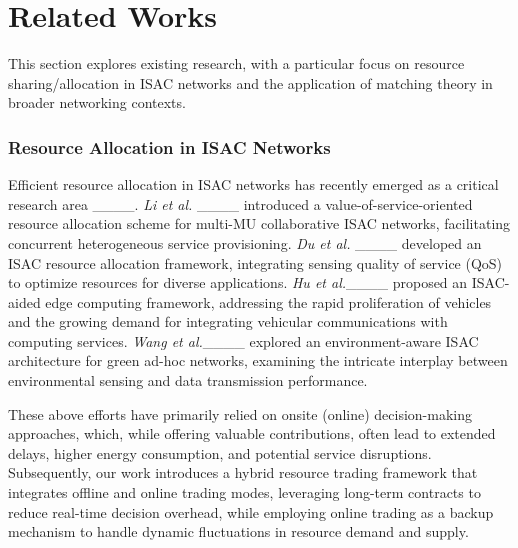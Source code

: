 \section{Related Works}
This section explores existing research, with a particular focus on resource sharing/allocation in ISAC networks and the application of matching theory in broader networking contexts.


\subsubsection{Resource Allocation in ISAC Networks} Efficient resource allocation in ISAC networks has recently emerged as a critical research area ____. \textit{Li et al.} ____ introduced a value-of-service-oriented resource allocation scheme for multi-MU collaborative ISAC networks, facilitating concurrent heterogeneous service provisioning. \textit{Du et al.} ____ developed an ISAC resource allocation framework, integrating sensing quality of service (QoS) to optimize resources for diverse applications. \textit{Hu et al.}____ proposed an ISAC-aided edge computing framework, addressing the rapid proliferation of vehicles and the growing demand for integrating vehicular communications with computing services. \textit{Wang et al.}____ explored an environment-aware ISAC architecture for green ad-hoc networks, examining the intricate interplay between environmental sensing and data transmission performance.

These above efforts have primarily relied on onsite (online) decision-making approaches, which, while offering valuable contributions, often lead to extended delays, higher energy consumption, and potential service disruptions. Subsequently, our work introduces a hybrid resource trading framework that integrates offline and online trading modes, leveraging long-term contracts to reduce real-time decision overhead, while employing online trading as a backup mechanism to handle dynamic fluctuations in resource demand and supply. 

